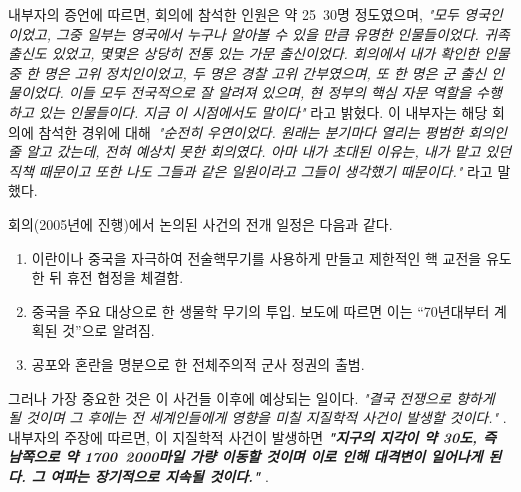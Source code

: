 \documentclass[10pt,twocolumn,letterpaper]{article}
\begin{document}
내부자의 증언에 따르면, 회의에 참석한 인원은 약 25~30명 정도였으며, \textit{"모두 영국인이었고, 그중 일부는 영국에서 누구나 알아볼 수 있을 만큼 유명한 인물들이었다. 귀족 출신도 있었고, 몇몇은 상당히 전통 있는 가문 출신이었다. 회의에서 내가 확인한 인물 중 한 명은 고위 정치인이었고, 두 명은 경찰 고위 간부였으며, 또 한 명은 군 출신 인물이었다. 이들 모두 전국적으로 잘 알려져 있으며, 현 정부의 핵심 자문 역할을 수행하고 있는 인물들이다. 지금 이 시점에서도 말이다"} \cite{4}라고 밝혔다. 이 내부자는 해당 회의에 참석한 경위에 대해\ \textit{"순전히 우연이었다. 원래는 분기마다 열리는 평범한 회의인 줄 알고 갔는데, 전혀 예상치 못한 회의였다. 아마 내가 초대된 이유는, 내가 맡고 있던 직책 때문이고 또한 나도 그들과 같은 일원이라고 그들이 생각했기 때문이다."} 라고 말했다\cite{4}.

회의(2005년에 진행)에서 논의된 사건의 전개 일정은 다음과 같다.

\begin{flushleft}
\begin{enumerate}
    \item 이란이나 중국을 자극하여 전술핵무기를 사용하게 만들고 제한적인 핵 교전을 유도한 뒤 휴전 협정을 체결함.
    \item 중국을 주요 대상으로 한 생물학 무기의 투입. 보도에 따르면 이는 “70년대부터 계획된 것”으로 알려짐.
    \item 공포와 혼란을 명분으로 한 전체주의적 군사 정권의 출범.
\end{enumerate}
\end{flushleft}

그러나 가장 중요한 것은 이 사건들 이후에 예상되는 일이다. \textit{"결국 전쟁으로 향하게 될 것이며 그 후에는 전 세계인들에게 영향을 미칠 지질학적 사건이 발생할 것이다."} \cite{4}. 내부자의 주장에 따르면, 이 지질학적 사건이 발생하면 \textit{\textbf{"지구의 지각이 약 30도, 즉 남쪽으로 약 1700~2000마일 가량 이동할 것이며 이로 인해 대격변이 일어나게 된다. 그 여파는 장기적으로 지속될 것이다."}} \cite{4}.
\end{document}
